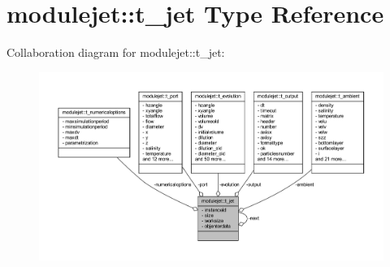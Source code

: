 \hypertarget{structmodulejet_1_1t__jet}{}\section{modulejet\+:\+:t\+\_\+jet Type Reference}
\label{structmodulejet_1_1t__jet}


Collaboration diagram for modulejet\+:\+:t\+\_\+jet\+:\nopagebreak
\begin{figure}[H]
\begin{center}
\leavevmode
\includegraphics[width=350pt]{structmodulejet_1_1t__jet__coll__graph}
\end{center}
\end{figure}
